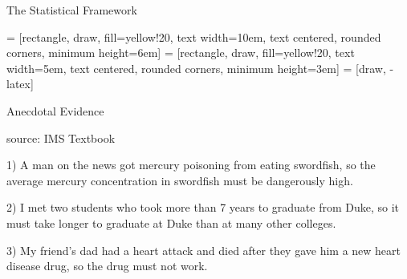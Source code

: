 \documentclass{beamer}
\begin{document}
\begin{frame}{The Statistical Framework}
\begin{center}
\usetikzlibrary{decorations.pathreplacing,positioning, arrows, shapes, calc,shapes.multipart}
 = [rectangle, draw, fill=yellow!20, 
    text width=10em, text centered, rounded corners, minimum height=6em]
 = [rectangle, draw, fill=yellow!20, 
    text width=5em, text centered, rounded corners, minimum height=3em]
 = [draw, -latex]
  \end{center}
\end{frame}



\begin{frame}{Anecdotal Evidence}

{\tiny source: IMS Textbook}

1) A man on the news got mercury poisoning from eating swordfish, so the average mercury concentration in swordfish must be dangerously high. \vspace{8mm}


2) I met two students who took more than 7 years to graduate from Duke, so it must take longer
to graduate at Duke than at many other colleges. \vspace{8mm}


3) My friend’s dad had a heart attack and died after they gave him a new heart disease drug, so
the drug must not work.
\end{frame}
\end{document}
